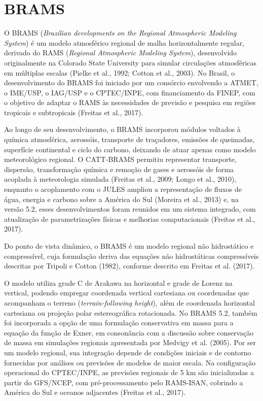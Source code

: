 \documentclass[12pt,a4paper,oneside]{book}
\begin{document}
\section{BRAMS}

O BRAMS (\emph{Brazilian developments on the Regional Atmospheric Modeling System}) é um modelo atmosférico regional de malha horizontalmente regular, derivado do RAMS (\emph{Regional Atmospheric Modeling System}), desenvolvido originalmente na Colorado State University para simular circulações atmosféricas em múltiplas escalas (Pielke et al., 1992; Cotton et al., 2003). No Brasil, o desenvolvimento do BRAMS foi iniciado por um consórcio envolvendo a ATMET, o IME/USP, o IAG/USP e o CPTEC/INPE, com financiamento da FINEP, com o objetivo de adaptar o RAMS às necessidades de previsão e pesquisa em regiões tropicais e subtropicais (Freitas et al., 2017).

Ao longo de seu desenvolvimento, o BRAMS incorporou módulos voltados à química atmosférica, aerossóis, transporte de traçadores, emissões de queimadas, superfície continental e ciclo do carbono, deixando de atuar apenas como modelo meteorológico regional. O CATT-BRAMS permitiu representar transporte, dispersão, transformação química e remoção de gases e aerossóis de forma acoplada à meteorologia simulada (Freitas et al., 2009; Longo et al., 2010), enquanto o acoplamento com o JULES ampliou a representação de fluxos de água, energia e carbono sobre a América do Sul (Moreira et al., 2013) e, na versão 5.2, esses desenvolvimentos foram reunidos em um sistema integrado, com atualização de parametrizações físicas e melhorias computacionais (Freitas et al., 2017).

Do ponto de vista dinâmico, o BRAMS é um modelo regional não hidrostático e compressível, cuja formulação deriva das equações não hidrostáticas compressíveis descritas por Tripoli e Cotton (1982), conforme descrito em Freitas et al. (2017).

O modelo utiliza grade C de Arakawa na horizontal e grade de Lorenz na vertical, podendo empregar coordenada vertical cartesiana ou coordenadas que acompanham o terreno (\emph{terrain-following height}), além de coordenada horizontal cartesiana ou projeção polar estereográfica rotacionada. No BRAMS 5.2, também foi incorporada a opção de uma formulação conservativa em massa para a equação da função de Exner, em consonância com a discussão sobre conservação de massa em simulações regionais apresentada por Medvigy et al. (2005). Por ser um modelo regional, sua integração depende de condições iniciais e de contorno fornecidas por análises ou previsões de modelos de maior escala. Na configuração operacional do CPTEC/INPE, as previsões regionais de 5 km são inicializadas a partir do GFS/NCEP, com pré-processamento pelo RAMS-ISAN, cobrindo a América do Sul e oceanos adjacentes (Freitas et al., 2017).
\end{document}
